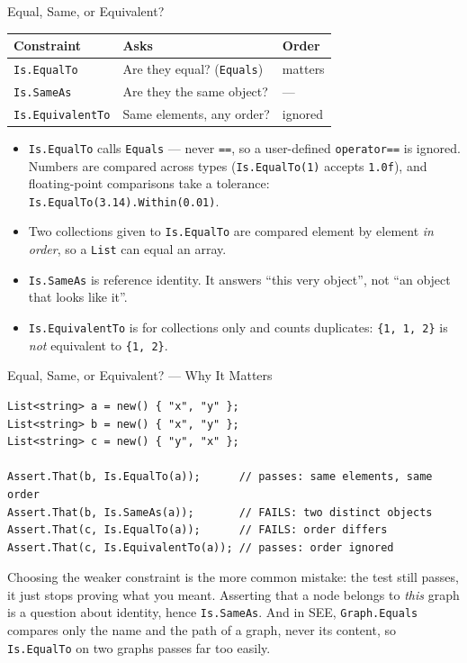 \begin{frame}[fragile]{Equal, Same, or Equivalent?}
  \begin{center}
    \begin{tabular}{lll}
      \hline
      \textbf{Constraint} & \textbf{Asks} & \textbf{Order}\\
      \hline
      \texttt{Is.EqualTo} & Are they equal? (\texttt{Equals}) & matters\\
      \texttt{Is.SameAs} & Are they the same object? & ---\\
      \texttt{Is.EquivalentTo} & Same elements, any order? & ignored\\
      \hline
    \end{tabular}
  \end{center}
  \vspace{2ex}

  \begin{itemize}
    \item \texttt{Is.EqualTo} calls \texttt{Equals} --- never \texttt{==}, so a
      user-defined \texttt{operator==} is ignored. Numbers are compared across
      types (\texttt{Is.EqualTo(1)} accepts \texttt{1.0f}), and floating-point
      comparisons take a tolerance: \texttt{Is.EqualTo(3.14).Within(0.01)}.
    \item Two collections given to \texttt{Is.EqualTo} are compared element by
      element \emph{in order}, so a \texttt{List} can equal an array.
    \item \texttt{Is.SameAs} is reference identity. It answers ``this very
      object'', not ``an object that looks like it''.
    \item \texttt{Is.EquivalentTo} is for collections only and counts
      duplicates: \texttt{\{1, 1, 2\}} is \emph{not} equivalent to
      \texttt{\{1, 2\}}.
  \end{itemize}
\end{frame}

\begin{frame}[fragile]{Equal, Same, or Equivalent? --- Why It Matters}
  \begin{lstlisting}[basicstyle=\scriptsize\ttfamily]
List<string> a = new() { "x", "y" };
List<string> b = new() { "x", "y" };
List<string> c = new() { "y", "x" };

Assert.That(b, Is.EqualTo(a));      // passes: same elements, same order
Assert.That(b, Is.SameAs(a));       // FAILS: two distinct objects
Assert.That(c, Is.EqualTo(a));      // FAILS: order differs
Assert.That(c, Is.EquivalentTo(a)); // passes: order ignored
  \end{lstlisting}

  Choosing the weaker constraint is the more common mistake: the test still
  passes, it just stops proving what you meant. Asserting that a node belongs
  to \emph{this} graph is a question about identity, hence
  \texttt{Is.SameAs}. And in SEE, \texttt{Graph.Equals} compares only the name
  and the path of a graph, never its content, so \texttt{Is.EqualTo} on two
  graphs passes far too easily.
\end{frame}

